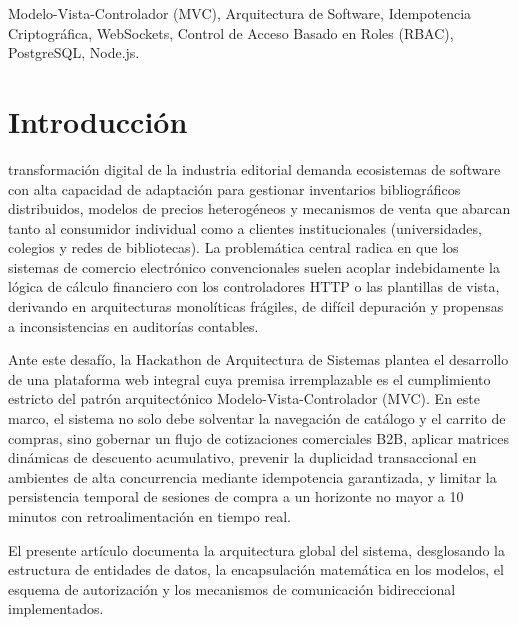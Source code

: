 \documentclass[conference]{IEEEtran}
\begin{document}
\begin{IEEEkeywords}
Modelo-Vista-Controlador (MVC), Arquitectura de Software, Idempotencia Criptográfica, WebSockets, Control de Acceso Basado en Roles (RBAC), PostgreSQL, Node.js.
\end{IEEEkeywords}

\section{Introducción}
 transformación digital de la industria editorial demanda ecosistemas de software con alta capacidad de adaptación para gestionar inventarios bibliográficos distribuidos, modelos de precios heterogéneos y mecanismos de venta que abarcan tanto al consumidor individual como a clientes institucionales (universidades, colegios y redes de bibliotecas). La problemática central radica en que los sistemas de comercio electrónico convencionales suelen acoplar indebidamente la lógica de cálculo financiero con los controladores HTTP o las plantillas de vista, derivando en arquitecturas monolíticas frágiles, de difícil depuración y propensas a inconsistencias en auditorías contables.

Ante este desafío, la Hackathon de Arquitectura de Sistemas plantea el desarrollo de una plataforma web integral cuya premisa irremplazable es el cumplimiento estricto del patrón arquitectónico Modelo-Vista-Controlador (MVC). En este marco, el sistema no solo debe solventar la navegación de catálogo y el carrito de compras, sino gobernar un flujo de cotizaciones comerciales B2B, aplicar matrices dinámicas de descuento acumulativo, prevenir la duplicidad transaccional en ambientes de alta concurrencia mediante idempotencia garantizada, y limitar la persistencia temporal de sesiones de compra a un horizonte no mayor a 10 minutos con retroalimentación en tiempo real.

El presente artículo documenta la arquitectura global del sistema, desglosando la estructura de entidades de datos, la encapsulación matemática en los modelos, el esquema de autorización y los mecanismos de comunicación bidireccional implementados.

\end{document}
